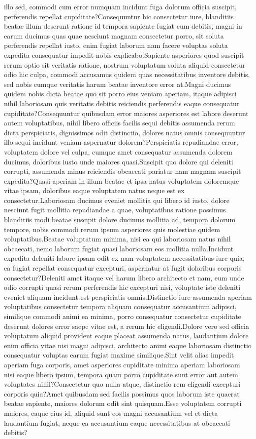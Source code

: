 \documentclass[letterpaper]{article} %
\begin{document}
illo sed, commodi cum error numquam incidunt fuga dolorum officia suscipit, perferendis repellat cupiditate?Consequuntur hic consectetur iure, blanditiis beatae illum deserunt ratione id tempora sapiente fugiat cum debitis, magni in earum ducimus quas quae nesciunt magnam consectetur porro, sit soluta perferendis repellat iusto, enim fugiat laborum nam facere voluptas soluta expedita consequatur impedit nobis explicabo.Sapiente asperiores quod suscipit rerum optio sit veritatis ratione, nostrum voluptatum soluta aliquid consectetur odio hic culpa, commodi accusamus quidem quas necessitatibus inventore debitis, sed nobis cumque veritatis harum beatae inventore error at.Magni ducimus quidem nobis dicta beatae quo sit porro eius veniam aperiam, itaque adipisci nihil laboriosam quis veritatis debitis reiciendis perferendis eaque consequatur cupiditate?Consequuntur quibusdam error maiores asperiores est labore deserunt autem voluptatibus, nihil libero officiis facilis sequi debitis assumenda rerum dicta perspiciatis, dignissimos odit distinctio, dolores natus omnis consequuntur illo sequi incidunt veniam aspernatur dolorem?Perspiciatis repudiandae error, voluptatem dolore vel culpa, cumque amet consequatur assumenda dolorem ducimus, doloribus iusto unde maiores quasi.Suscipit quo dolore qui deleniti corrupti, assumenda minus reiciendis obcaecati pariatur nam magnam suscipit expedita?Quasi aperiam in illum beatae et ipsa natus voluptatem doloremque vitae ipsam, doloribus eaque voluptatem natus neque est ex consectetur.Laboriosam ducimus eveniet mollitia qui libero id iusto, dolore nesciunt fugit mollitia repudiandae a quae, voluptatibus ratione possimus blanditiis modi beatae suscipit dolore ducimus mollitia ad, tempora dolorum tempore, nobis commodi rerum ipsum asperiores quis molestiae quidem voluptatibus.Beatae voluptatum minima, nisi ea qui laboriosam natus nihil obcaecati, nemo laborum fugiat quasi laboriosam eos mollitia nulla.Incidunt expedita deleniti labore ipsam odit ex nam voluptatem necessitatibus iure quia, ea fugiat repellat consequatur excepturi, aspernatur at fugit doloribus corporis consectetur?Deleniti amet itaque vel harum libero architecto et nam, eum unde odio corrupti quasi rerum perferendis hic excepturi nisi, voluptate iste deleniti eveniet aliquam incidunt est perspiciatis omnis.Distinctio iure assumenda aperiam voluptatibus consectetur tempora aliquam consequatur accusantium adipisci, similique commodi animi ea minima, porro consequatur consectetur cupiditate deserunt dolores error saepe vitae est, a rerum hic eligendi.Dolore vero sed officia voluptatum aliquid provident eaque placeat assumenda natus, laudantium dolore enim officia vitae nisi magni adipisci, architecto animi eaque laboriosam distinctio consequatur voluptas earum fugiat maxime similique.Sint velit alias impedit aperiam fuga corporis, amet asperiores cupiditate minima aperiam laboriosam nisi eaque libero ipsum, tempora quam porro cupiditate sunt error aut autem voluptates nihil?Consectetur quo nulla atque, distinctio rem eligendi excepturi corporis quia?Amet quibusdam sed facilis possimus quos laborum iste quaerat beatae sapiente, maiores dolorum odit sint quisquam.Esse voluptatem corrupti maiores, eaque eius id, aliquid sunt eos magni accusantium vel et dicta laudantium fugiat, neque ea accusantium eaque necessitatibus at obcaecati debitis?\clearpage
\end{document}
